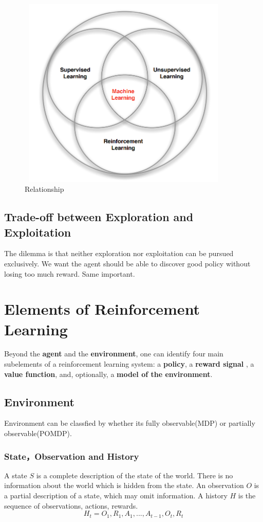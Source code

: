 \documentclass{article}
\begin{document}
\begin{CJK*}{UTF8}{gbsn}
\begin{figure}[H]
\centering
\includegraphics[width=4in,height=3.6in]{1}
\caption{Relationship}
\end{figure}

\subsection{Trade-off between Exploration and Exploitation}
The dilemma is that neither exploration nor exploitation can be pursued exclusively. We want the agent should be able to discover good policy without losing too much reward. Same important.


\section{Elements of Reinforcement Learning}
Beyond the \textbf{agent} and the \textbf{environment}, one can identify four main subelements of a
reinforcement learning system: a \textbf{policy}, a \textbf{reward signal} , a \textbf{value function}, and, optionally,
a \textbf{model of the environment}.


\subsection{Environment}
Environment can be classfied by whether its fully observable(MDP) or partially observable(POMDP).


\subsubsection{State，Observation and History}
A state $S$ is a complete description of the state of the world. There is no information about the world which is hidden from the state. An observation $O$ is a partial description of a state, which may omit information. A history $H$ is the sequence of observations, actions, rewards.
$$H_{t}=O_{1},R_{1},A_{1},...,A_{t-1},O_{t},R_{t}$$


\end{CJK*}
\end{document}
